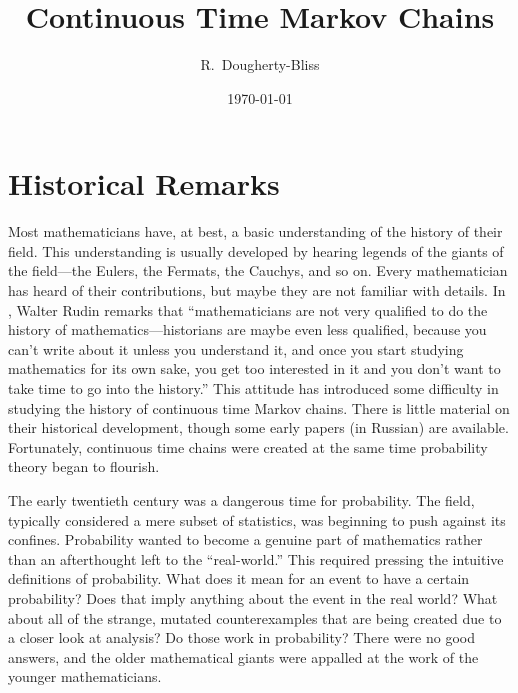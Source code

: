 \documentclass[12pt]{article}
\title{Continuous Time Markov Chains}
\author{R.~Dougherty-Bliss}
\date{\today}
\theoremstyle{definition}
\begin{document}
\maketitle

\section{Historical Remarks}
\label{sec:historical_remarks}

Most mathematicians have, at best, a basic understanding of the history of
their field. This understanding is usually developed by hearing legends of the
giants of the field---the Eulers, the Fermats, the Cauchys, and so on. Every
mathematician has heard of their contributions, but maybe they are not familiar
with details. In \cite{rudin2014offspring}, Walter Rudin remarks that
``mathematicians are not very qualified to do the history of
mathematics---historians are maybe even less qualified, because you can't write
about it unless you understand it, and once you start studying mathematics for
its own sake, you get too interested in it and you don't want to take time to
go into the history.'' This attitude has introduced some difficulty in studying
the history of continuous time Markov chains. There is little material on their
historical development, though some early papers (in Russian) are available.
Fortunately, continuous time chains were created at the same time probability
theory began to flourish.

The early twentieth century was a dangerous time for probability. The field,
typically considered a mere subset of statistics, was beginning to push against
its confines. Probability wanted to become a genuine part of mathematics rather
than an afterthought left to the ``real-world.'' This required pressing the
intuitive definitions of probability. What does it mean for an event to have a
certain probability? Does that imply anything about the event in the real
world? What about all of the strange, mutated counterexamples that are being
created due to a closer look at analysis? Do those work in probability? There
were no good answers, and the older mathematical giants were appalled at the
work of the younger mathematicians.
\end{document}
